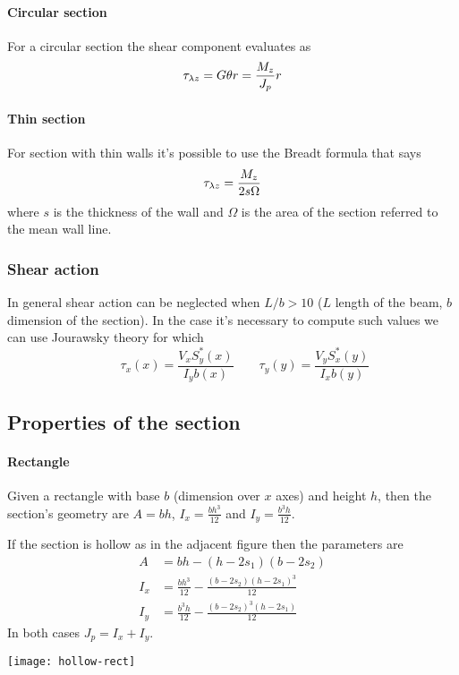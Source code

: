 \begin{multicols}
	\paragraph{Circular section} For a circular section the shear component evaluates as
	\[ \tau_{\lambda z} = G \theta r = \frac{M_z}{J_p} r \]
	
	\paragraph{Thin section} For section with thin walls it's possible to use the Breadt formula that says
	\[ \tau_{\lambda z} = \frac{M_z}{2s\Omega} \]
	where $s$ is the thickness of the wall and $\Omega$ is the area of the section referred to the mean wall line.
	
\subsubsection{Shear action}	
	In general shear action can be neglected when $L/b>10$ ($L$ length of the beam, $b$ dimension of the section). In the case it's necessary to compute such values we can use Jourawsky theory for which
	\[ \qquad \tau_x (x) = \frac{V_x S_y^*(x)}{I_y b(x)} \qquad \tau_y (y) = \frac{V_y S_x^*(y)}{I_x b(y)} \]
	
\end{multicols}
	
\subsection{Properties of the section}
	\paragraph{Rectangle} Given a rectangle with base $b$ (dimension over $x$ axes) and height $h$, then the section's geometry are $A=bh$, $I_x = \frac{bh^3}{12}$ and $I_y = \frac{b^3h}{12}$. 
	\begin{multicols}{2}
		If the section is hollow as in the adjacent figure then the parameters are
		\begin{align*}
			 A & = bh  - (h-2s_1)(b-2s_2)  \\
			 I_x & = \frac{bh^3}{12} - \frac{(b-2s_2)(h-2s_1)^3}{12}\\
			 I_y & = \frac{b^3h}{12} - \frac{(b-2s_2)^3(h-2s_1)}{12} 
		\end{align*}
		In both cases $J_p = I_x + I_y$.
		\begin{center}
			\texttt{[image: hollow-rect]}
		\end{center}
	\end{multicols}
	
